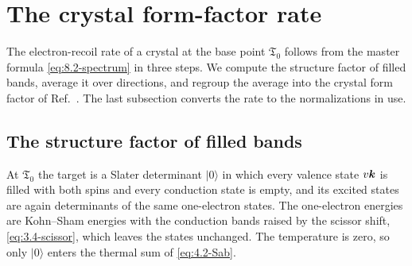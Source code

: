 \section{The crystal form-factor rate}\label{app:D.29}

The electron-recoil rate of a crystal at the base point $\mathfrak{T}_0$ follows from the master formula \cref{eq:8.2-spectrum} in three steps. We compute the structure factor of filled bands, average it over directions, and regroup the average into the crystal form factor of Ref.~\cite{essig2016direct}. The last subsection converts the rate to the normalizations in use.

\subsection{The structure factor of filled bands}

At $\mathfrak{T}_0$ the target is a Slater determinant $|0\rangle$ in which every valence state $v\bm{k}$ is filled with both spins and every conduction state is empty, and its excited states are again determinants of the same one-electron states. The one-electron energies are Kohn--Sham energies with the conduction bands raised by the scissor shift, \cref{eq:3.4-scissor}, which leaves the states unchanged. The temperature is zero, so only $|0\rangle$ enters the thermal sum of \cref{eq:4.2-Sab}.

